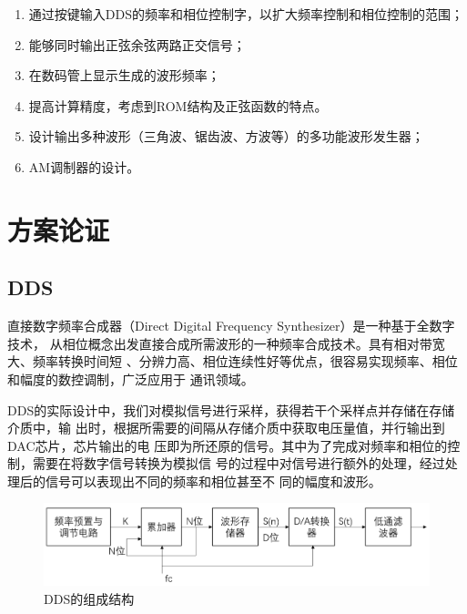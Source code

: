 \documentclass[twoside, openright]{article}
\begin{document}
\begin{enumerate}

	\item 通过按键输入DDS的频率和相位控制字，以扩大频率控制和相位控制的范围；

	\item 能够同时输出正弦余弦两路正交信号；

	\item 在数码管上显示生成的波形频率；

	\item 提高计算精度，考虑到ROM结构及正弦函数的特点。

	\item 设计输出多种波形（三角波、锯齿波、方波等）的多功能波形发生器；

	\item AM调制器的设计。

\end{enumerate}

\section{方案论证}%
\label{sec:方案论证}

\subsection{DDS}%
\label{sub:DDS}

直接数字频率合成器（Direct Digital Frequency Synthesizer）是一种基于全数字技术，
从相位概念出发直接合成所需波形的一种频率合成技术。具有相对带宽大、频率转换时间短
、分辨力高、相位连续性好等优点，很容易实现频率、相位和幅度的数控调制，广泛应用于
通讯领域。

DDS的实际设计中，我们对模拟信号进行采样，获得若干个采样点并存储在存储介质中，输
出时，根据所需要的间隔从存储介质中获取电压量值，并行输出到DAC芯片，芯片输出的电
压即为所还原的信号。其中为了完成对频率和相位的控制，需要在将数字信号转换为模拟信
号的过程中对信号进行额外的处理，经过处理后的信号可以表现出不同的频率和相位甚至不
同的幅度和波形。

\begin{figure}[htbp]
	\centering
	\includegraphics[width=0.8\linewidth]{DDS.png}
	\caption{DDS的组成结构}
	\label{fig:DDS的组成结构}
\end{figure}
\end{document}
